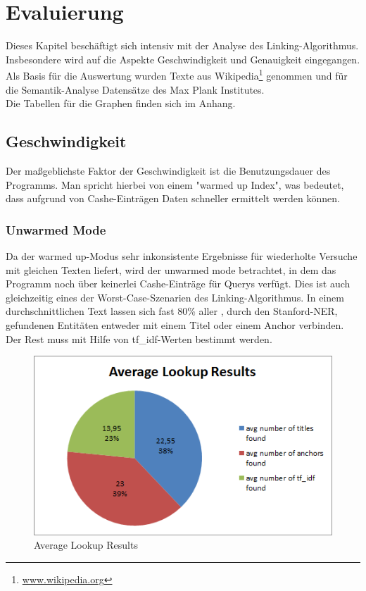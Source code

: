 \documentclass[11pt, a4paper, oneside]{Thesis} %
\begin{document}
\chapter{Evaluierung}
\label{Kapitel 4}

Dieses Kapitel besch\"aftigt sich intensiv mit der Analyse des Linking-Algorithmus. Insbesondere wird auf die Aspekte Geschwindigkeit und Genauigkeit eingegangen. Als Basis f\"ur die Auswertung wurden Texte aus Wikipedia\footnote{\url{www.wikipedia.org}} genommen und f\"ur die Semantik-Analyse Datens\"atze des Max Plank Institutes.\\
Die Tabellen f\"ur die Graphen finden sich im Anhang.

\section{Geschwindigkeit}
Der ma\ss geblichste Faktor der Geschwindigkeit ist die Benutzungsdauer des Programms. Man spricht hierbei von einem "warmed up Index", was bedeutet, dass aufgrund von Cashe-Eintr\"agen Daten schneller ermittelt werden k\"onnen.
\subsection{Unwarmed Mode}
Da der \grqq warmed up\grqq{}-Modus sehr inkonsistente Ergebnisse f\"ur wiederholte Versuche mit gleichen Texten liefert, wird der \grqq unwarmed mode\grqq{} betrachtet, in dem das Programm noch \"uber keinerlei Cashe-Eintr\"age f\"ur Querys verf\"ugt. Dies ist auch gleichzeitig eines der Worst-Case-Szenarien des Linking-Algorithmus.\clearpage
In einem durchschnittlichen Text lassen sich fast 80\% aller , durch den Stanford-NER, gefundenen Entit\"aten entweder mit einem Titel oder einem Anchor verbinden. Der Rest muss mit Hilfe von tf\_idf-Werten bestimmt werden.
\begin{figure}[ht!]
\centering
\includegraphics[scale=1]{./lookupRes.png}
\caption[Average Lookup Results]{Average Lookup Results}
\end{figure}
\end{document}
